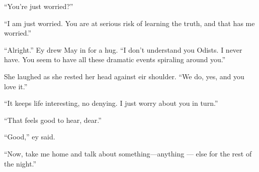 ``You're just worried?''

``I am just worried. You are at serious risk of learning the truth, and that has me worried.''

``Alright.'' Ey drew May in for a hug. ``I don't understand you Odists. I never have. You seem to have all these dramatic events spiraling around you.''

She laughed as she rested her head against eir shoulder. ``We do, yes, and you love it.''

``It keeps life interesting, no denying. I just worry about you in turn.''

``That feels good to hear, dear.''

``Good,'' ey said.

``Now, take me home and talk about something---anything — else for the rest of the night.''
